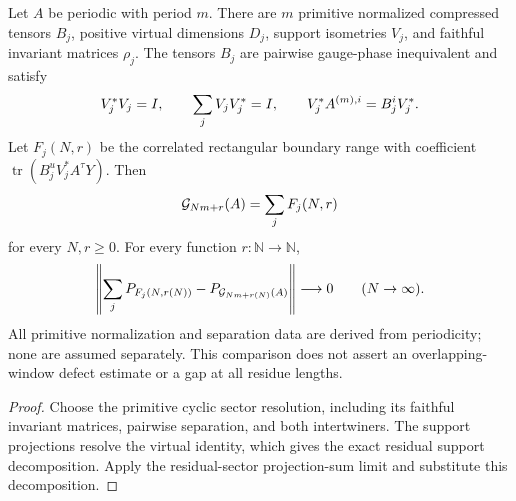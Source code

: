 \begin{lemma}
    \label{thm:periodic_residual_projection_sum}
    \leanok
    Let $A$ be periodic with period $m$. There are $m$ primitive normalized
    compressed tensors $B_j$, positive virtual dimensions $D_j$, support
    isometries $V_j$, and faithful invariant matrices $\rho_j$. The tensors
    $B_j$ are pairwise gauge-phase inequivalent and satisfy
    \begin{align}
        V_j^*V_j=I,\qquad \sum_jV_jV_j^*=I,\qquad
        V_j^*A^{(m),i}=B_j^iV_j^*.
        \notag
    \end{align}
    Let $F_j(N,r)$ be the correlated rectangular boundary range with
    coefficient $\operatorname{tr}(B_j^uV_j^*A^\tau Y)$. Then
    \begin{align}
        \mathcal G_{Nm+r}(A)=\sum_jF_j(N,r)
        \notag
    \end{align}
    for every $N,r\geq0$. For every function $r:\mathbb N\to\mathbb N$,
    \begin{align}
        \left\lVert\sum_jP_{F_j(N,r(N))}-P_{\mathcal G_{Nm+r(N)}(A)}\right\rVert
        \longrightarrow0 \qquad(N\to\infty).
        \notag
    \end{align}
    All primitive normalization and separation data are derived from
    periodicity; none are assumed separately. This comparison does not assert
    an overlapping-window defect estimate or a gap at all residue lengths.
\end{lemma}
\begin{proof}\leanok
    Choose the primitive cyclic sector resolution, including its faithful
    invariant matrices, pairwise separation, and both intertwiners. The support
    projections resolve the virtual identity, which gives the exact residual
    support decomposition. Apply the residual-sector projection-sum limit and
    substitute this decomposition.
\end{proof}

